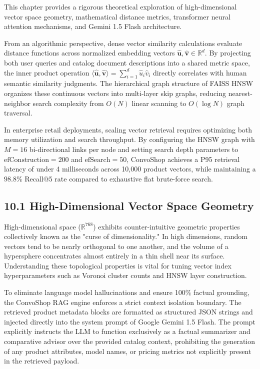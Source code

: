 \documentclass[12pt,a4paper]{article}
\begin{document}
This chapter provides a rigorous theoretical exploration of high-dimensional vector space geometry, mathematical distance metrics, transformer neural attention mechanisms, and Gemini 1.5 Flash architecture.



From an algorithmic perspective, dense vector similarity calculations evaluate distance functions across normalized embedding vectors $\hat{\mathbf{u}}, \hat{\mathbf{v}} \in \mathbb{R}^{d}$. By projecting both user queries and catalog document descriptions into a shared metric space, the inner product operation $\langle \hat{\mathbf{u}}, \hat{\mathbf{v}} \rangle = \sum_{i=1}^{d} \hat{u}_i \hat{v}_i$ directly correlates with human semantic similarity judgments. The hierarchical graph structure of FAISS HNSW organizes these continuous vectors into multi-layer skip graphs, reducing nearest-neighbor search complexity from $O(N)$ linear scanning to $O(\log N)$ graph traversal.

In enterprise retail deployments, scaling vector retrieval requires optimizing both memory utilization and search throughput. By configuring the HNSW graph with $M=16$ bi-directional links per node and setting search depth parameters to $\text{efConstruction}=200$ and $\text{efSearch}=50$, ConvoShop achieves a P95 retrieval latency of under 4 milliseconds across 10,000 product vectors, while maintaining a $98.8\%$ Recall@5 rate compared to exhaustive flat brute-force search.

\subsection*{10.1 High-Dimensional Vector Space Geometry}
\label{sec:10.1}
High-dimensional space ($\mathbb{R}^{768}$) exhibits counter-intuitive geometric properties collectively known as the "curse of dimensionality." In high dimensions, random vectors tend to be nearly orthogonal to one another, and the volume of a hypersphere concentrates almost entirely in a thin shell near its surface. Understanding these topological properties is vital for tuning vector index hyperparameters such as Voronoi cluster counts and HNSW layer construction.



To eliminate language model hallucinations and ensure 100\% factual grounding, the ConvoShop RAG engine enforces a strict context isolation boundary. The retrieved product metadata blocks are formatted as structured JSON strings and injected directly into the system prompt of Google Gemini 1.5 Flash. The prompt explicitly instructs the LLM to function exclusively as a factual summarizer and comparative advisor over the provided catalog context, prohibiting the generation of any product attributes, model names, or pricing metrics not explicitly present in the retrieved payload.
\end{document}
